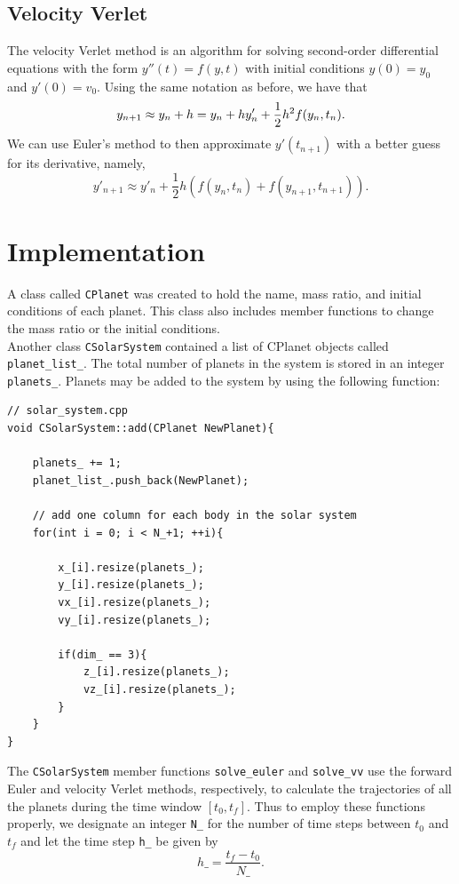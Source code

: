 \documentclass[prb,aps,twocolumn,showpacs,10pt]{revtex4-1}
\begin{document}
\subsection{Velocity Verlet}
The velocity Verlet method is an algorithm for solving second-order differential equations with the form $y''(t)=f(y,t)$ with initial conditions $y(0)=y_0$ and $y'(0)=v_{0}$. Using the same notation as before, we have that
\begin{equation}
y_{n+1}\approx y_n+h=y_n+hy'_n+\frac{1}{2}h^2f(y_n,t_n).\\
\end{equation}
We can use Euler's method to then approximate $y'(t_{n+1})$ with a better guess for its derivative, namely,
\begin{equation}
y'_{n+1}\approx y'_n+\frac{1}{2}h(f(y_n,t_n)+f(y_{n+1},t_{n+1})).
\end{equation}

\section{Implementation}

A class called \texttt{CPlanet} was created to hold the name, mass ratio, and initial conditions of each planet. This class also includes member functions to change the mass ratio or the initial conditions. \\

Another class \texttt{CSolarSystem} contained a list of CPlanet objects called \texttt{planet\_list\_}. The total number of planets in the system is stored in an integer \texttt{planets\_}. Planets may be added to the system by using the following function:
\begin{lstlisting}
// solar_system.cpp
void CSolarSystem::add(CPlanet NewPlanet){

	planets_ += 1;
	planet_list_.push_back(NewPlanet);

	// add one column for each body in the solar system
	for(int i = 0; i < N_+1; ++i){

		x_[i].resize(planets_);
		y_[i].resize(planets_);
		vx_[i].resize(planets_);
		vy_[i].resize(planets_);

		if(dim_ == 3){
			z_[i].resize(planets_);
			vz_[i].resize(planets_);
		}
	}
}
\end{lstlisting}

The \texttt{CSolarSystem} member functions \texttt{solve\_euler} and \texttt{solve\_vv} use the forward Euler and velocity Verlet methods, respectively, to calculate the trajectories of all the planets during the time window $[t_0, t_f]$. 
Thus to employ these functions properly, we designate an integer \texttt{N\_} for the number of time steps between $t_0$ and $t_f$ and let the time step \texttt{h\_} be given by
\begin{equation}
h\text{\_} = \frac{t_f-t_0}{N\text{\_}}.
\end{equation}
\end{document}
